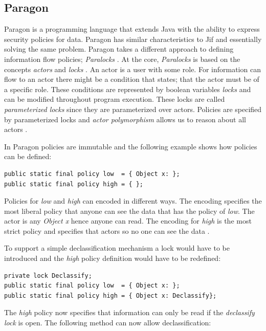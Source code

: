 \subsection{Paragon}

Paragon is a programming language that extends Java with the ability to express security policies for data. Paragon has similar characteristics to Jif and essentially solving the same problem. Paragon takes a different approach to defining information flow policies; \emph{Paralocks} \cite{paralocks} \cite{paragonpaper}.
At the core, \emph{Paralocks} is based on the concepts \emph{actors} and \emph{locks} \cite{paralocks}. An actor is a user with some role. For information can flow to an actor there might be a condition that states; that the actor must be of a specific role. These conditions are represented by boolean variables \emph{locks} and can be modified throughout program execution. These locks are called \emph{parameterized locks} since they are parameterized over actors. Policies are specified by parameterized locks and \emph{actor polymorphism} allows us to reason about all actors \cite{paragonpaper}.


In Paragon policies are immutable and the following example shows how policies can be defined:

\begin{lstlisting}
public static final policy low  = { Object x: };
public static final policy high = { };
\end{lstlisting}

Policies for \emph{low} and \emph{high} can encoded in different ways. The encoding specifies the most liberal policy that anyone can see the data that has the policy of \emph{low}. The actor is any \emph{Object x} hence anyone can read. The encoding for \emph{high} is the most strict policy and specifies that actors so no one can see the data \cite{paragonprogramming}.

To support a simple declassification mechanism a lock would have to be introduced and the \emph{high} policy definition would have to be redefined:

\begin{lstlisting}
private lock Declassify;
public static final policy low  = { Object x: };
public static final policy high = { Object x: Declassify};
\end{lstlisting} 

The \emph{high} policy now specifies that information can only be read if the \emph{ declassify lock} is open. The following method can now allow declassification:

